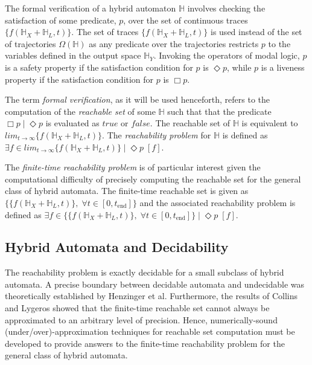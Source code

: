 The formal verification of a hybrid automaton $\mathbb{H}$ involves checking the satisfaction of some predicate, $p$, over the set of continuous traces $\{ f(\mathbb{H}_X + \mathbb{H}_L, t) \}$. The set of traces $\{ f(\mathbb{H}_X + \mathbb{H}_L, t) \}$ is used instead of the set of trajectories $\Omega(\mathbb{H})$ as any predicate over the trajectories restricts $p$ to the variables defined in the output space $\mathbb{H}_Y$. Invoking the operators of modal logic, $p$ is a safety property if the satisfaction condition for $p$ is $ \Diamond p$, while $p$ is a liveness property if the satisfaction condition for $p$ is $\Box p$.

The term \textit{formal verification}, as it will be used henceforth, refers to the computation of the \textit{reachable set} of some $\mathbb{H}$ such that that the predicate $\Box p \; | \; \Diamond  p$ is evaluated as $true$ or $false$. The reachable set of $\mathbb{H}$ is equivalent to $lim_{t \rightarrow \infty} \{ f(\mathbb{H}_X + \mathbb{H}_L, t) \}$. The \textit{reachability problem} for $\mathbb{H}$ is defined as $\exists f \in lim_{t \rightarrow \infty} \{ f(\mathbb{H}_X + \mathbb{H}_L, t) \} \; | \; \Diamond p \; [f]$.

The \textit{finite-time reachability problem} is of particular interest given the computational difficulty of precisely computing the reachable set for the general class of hybrid automata. The finite-time reachable set is given as $\Big\{ \{ f(\mathbb{H}_X + \mathbb{H}_L, t) \}, \; \forall t \in [0, t_{\text{end}}] \Big\}$ and the associated reachability problem is defined as $\exists f \in \Big\{ \{ f(\mathbb{H}_X + \mathbb{H}_L, t) \}, \; \forall t \in [0, t_{\text{end}}] \Big\} \; | \; \Diamond p \; [f]$.


\subsection{Hybrid Automata and Decidability}

The reachability problem is exactly decidable for a small subclass of hybrid automata. A precise boundary between decidable automata and undecidable was theoretically established by Henzinger et al. Furthermore, the results of Collins and Lygeros showed that the finite-time reachable set cannot always be approximated to an arbitrary level of precision. Hence, numerically-sound (under/over)-approximation techniques for reachable set computation must be developed to provide answers to the finite-time reachability problem for the general class of hybrid automata.

